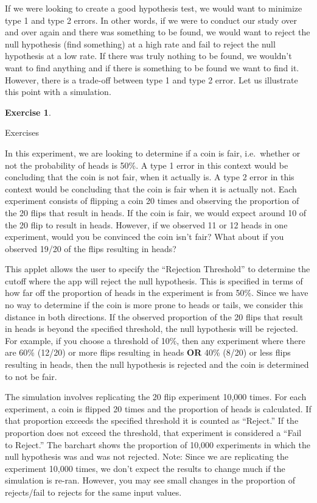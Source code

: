 \documentclass[
]{book}
\theoremstyle{definition}
\theoremstyle{definition}
\theoremstyle{definition}
\newtheorem{exercise}{Exercise}[chapter]
\theoremstyle{remark}
\begin{document}
If we were looking to create a good hypothesis test, we would want to minimize type 1 and type 2 errors. In other words, if we were to conduct our study over and over again and there was something to be found, we would want to reject the null hypothesis (find something) at a high rate and fail to reject the null hypothesis at a low rate. If there was truly nothing to be found, we wouldn't want to find anything and if there is something to be found we want to find it. However, there is a trade-off between type 1 and type 2 error. Let us illustrate this point with a simulation.

\begin{exercise}
\protect\hypertarget{exr:unlabeled-div-8}{}\label{exr:unlabeled-div-8}

Exercises

\end{exercise}

In this experiment, we are looking to determine if a coin is fair, i.e.~whether or not the probability of heads is 50\%. A type 1 error in this context would be concluding that the coin is not fair, when it actually is. A type 2 error in this context would be concluding that the coin is fair when it is actually not. Each experiment consists of flipping a coin 20 times and observing the proportion of the 20 flips that result in heads. If the coin is fair, we would expect around 10 of the 20 flip to result in heads. However, if we observed 11 or 12 heads in one experiment, would you be convinced the coin isn't fair? What about if you observed 19/20 of the flips resulting in heads?

This applet allows the user to specify the ``Rejection Threshold'' to determine the cutoff where the app will reject the null hypothesis. This is specified in terms of how far off the proportion of heads in the experiment is from 50\%. Since we have no way to determine if the coin is more prone to heads or tails, we consider this distance in both directions. If the observed proportion of the 20 flips that result in heads is beyond the specified threshold, the null hypothesis will be rejected. For example, if you choose a threshold of 10\%, then any experiment where there are 60\% (12/20) or more flips resulting in heads \textbf{OR} 40\% (8/20) or less flips resulting in heads, then the null hypothesis is rejected and the coin is determined to not be fair.

The simulation involves replicating the 20 flip experiment 10,000 times. For each experiment, a coin is flipped 20 times and the proportion of heads is calculated. If that proportion exceeds the specified threshold it is counted as ``Reject.'' If the proportion does not exceed the threshold, that experiment is considered a ``Fail to Reject.'' The barchart shows the proportion of 10,000 experiments in which the null hypothesis was and was not rejected. Note: Since we are replicating the experiment 10,000 times, we don't expect the results to change much if the simulation is re-ran. However, you may see small changes in the proportion of rejects/fail to rejects for the same input values.
\end{document}
